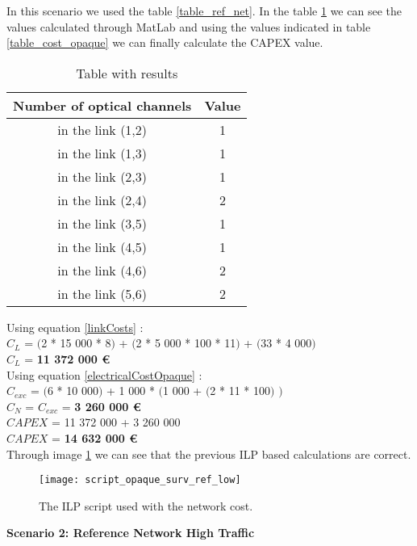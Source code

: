 In this scenario we used the table \ref{table_ref_net}. In the table \ref{result_ILP1_reference} we can see the values calculated through MatLab and using the values indicated in table \ref{table_cost_opaque} we can finally calculate the CAPEX value.
\begin{table}[h!]
\centering
\begin{tabular}{|| c | c||}
 \hline
 Number of optical channels & Value \\
 \hline\hline
 in the link (1,2) & 1 \\
 in the link (1,3) & 1 \\
 in the link (2,3) & 1 \\
 in the link (2,4) & 2 \\
 in the link (3,5) & 1 \\
 in the link (4,5) & 1 \\
 in the link (4,6) & 2 \\
 in the link (5,6) & 2 \\
 \hline
\end{tabular}
\caption{Table with results}
\label{result_ILP1_reference}
\end{table}

Using equation \ref{linkCosts} : \\
$C_L$ = $($2 * 15 000 * 8$)$ + $($2 * 5 000 * 100 * 11$)$ + $($33 * 4 000$)$ \\
$C_L$ = \textbf{11 372 000 \euro} \\


Using equation \ref{electricalCostOpaque} : \\
$C_{exc}$ = $($6 * 10 000$)$ + 1 000 * $($1 000 + $($2 * 11 * 100$)$ $)$ \\
$C_N$ = $C_{exc}$ = \textbf{3 260 000 \euro} \\

$CAPEX$ = 11 372 000 + 3 260 000 \\
$CAPEX$ = \textbf{14 632 000 \euro}\\

Through image \ref{scriptopaque_surv_ref_low} we can see that the previous ILP based calculations are correct.
\begin{figure}[h!]
\centering
\texttt{[image: script\_opaque\_surv\_ref\_low]}
\caption{The ILP script used with the network cost.}
\label{scriptopaque_surv_ref_low}
\end{figure}


\textbf{Scenario 2: Reference Network High Traffic} \label{Scenario2_opaque} \\


